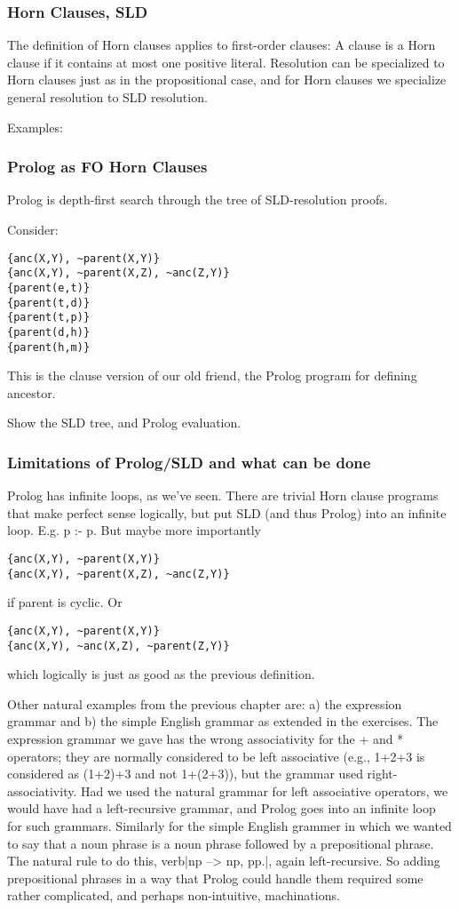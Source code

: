 \subsubsection{Horn Clauses, SLD}

The definition of Horn clauses applies to first-order clauses: A
clause is a Horn clause if it contains at most one positive literal.
Resolution can be specialized to Horn clauses just as in the
propositional case, and for Horn clauses we specialize general
resolution to SLD resolution.  

Examples: 

\subsubsection{Prolog as FO Horn Clauses}
Prolog is depth-first search through the tree of SLD-resolution
proofs.

Consider:

\begin{verbatim}
{anc(X,Y), ~parent(X,Y)}
{anc(X,Y), ~parent(X,Z), ~anc(Z,Y)}
{parent(e,t)}
{parent(t,d)}
{parent(t,p)}
{parent(d,h)}
{parent(h,m)}
\end{verbatim}

This is the clause version of our old friend, the Prolog program for
defining ancestor.

Show the SLD tree, and Prolog evaluation.

\subsubsection{Limitations of Prolog/SLD and what can be done}

Prolog has infinite loops, as we've seen.  There are trivial Horn
clause programs that make perfect sense logically, but put SLD (and
thus Prolog) into an infinite loop. E.g. p :- p. But maybe more
importantly 
\begin{verbatim}
{anc(X,Y), ~parent(X,Y)}
{anc(X,Y), ~parent(X,Z), ~anc(Z,Y)}
\end{verbatim}
if parent is cyclic.  Or 
\begin{verbatim}
{anc(X,Y), ~parent(X,Y)}
{anc(X,Y), ~anc(X,Z), ~parent(Z,Y)}
\end{verbatim}
which logically is just as good as the previous definition.

Other natural examples from the previous chapter are: a) the
expression grammar and b) the simple English grammar as extended in
the exercises.  The expression grammar we gave has the wrong
associativity for the + and * operators; they are normally considered
to be left associative (e.g., 1+2+3 is considered as (1+2)+3 and not
1+(2+3)), but the grammar used right-associativity.  Had we used the
natural grammar for left associative operators, we would have had a
left-recursive grammar, and Prolog goes into an infinite loop for such
grammars.  Similarly for the simple English grammer in which we wanted
to say that a noun phrase is a noun phrase followed by a prepositional
phrase.  The natural rule to do this, verb|np --> np, pp.|, again
left-recursive.  So adding prepositional phrases in a way that Prolog
could handle them required some rather complicated, and perhaps
non-intuitive, machinations.


